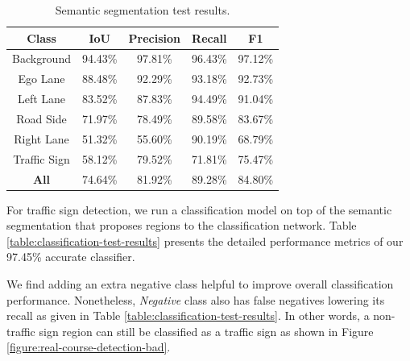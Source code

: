 \begin{table}[h]
  \begin{center}
    \caption[Semantic segmentation test results]{Semantic segmentation
      test results.}
    \label{table:semantic-segmentation-test-results}
    \begin{tabular}{|c|c|c|c|c|}
      \hline
      \textbf{Class} & \textbf{IoU} & \textbf{Precision} & \textbf{Recall} & \textbf{F1}  \\
      \hline
      Background     & 94.43\%      & 97.81\%            & 96.43\%         & 97.12\%      \\
      Ego Lane       & 88.48\%      & 92.29\%            & 93.18\%         & 92.73\%      \\
      Left Lane      & 83.52\%      & 87.83\%            & 94.49\%         & 91.04\%      \\
      Road Side      & 71.97\%      & 78.49\%            & 89.58\%         & 83.67\%      \\
      Right Lane     & 51.32\%      & 55.60\%            & 90.19\%         & 68.79\%      \\
      Traffic Sign   & 58.12\%      & 79.52\%            & 71.81\%         & 75.47\%      \\
      \hline
      \textbf{All}   & 74.64\%      & 81.92\%            & 89.28\%         & 84.80\%      \\
      \hline
    \end{tabular}
  \end{center}
\end{table}

For traffic sign detection, we run a classification model on top of the
semantic segmentation that proposes regions to the classification
network. Table \ref{table:classification-test-results} presents the detailed
performance metrics of our 97.45\% accurate classifier.

We find adding an extra negative class helpful to improve overall
classification performance. Nonetheless, \textit{Negative} class also has false
negatives lowering its recall as given in Table
\ref{table:classification-test-results}. In other words, a non-traffic sign
region can still be classified as a traffic sign as shown in Figure
\ref{figure:real-course-detection-bad}.

